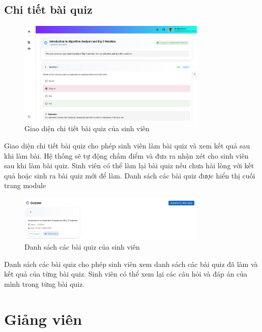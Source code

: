\subsection{Chi tiết bài quiz}
\begin{figure}[H]
    \centering
    \includegraphics[width=0.8\textwidth]{images/CapScreen_Student/Quiz.png}
    \caption{Giao diện chi tiết bài quiz của sinh viên}
    \label{fig:quiz_detail_page}
\end{figure}
Giao diện chi tiết bài quiz cho phép sinh viên làm bài quiz và xem kết quả sau khi làm bài. Hệ thống sẽ tự động chấm điểm và đưa ra nhận xét cho sinh viên sau khi làm bài quiz. Sinh viên có thể làm lại bài quiz nếu chưa hài lòng với kết quả hoặc sinh ra bài quiz mới để làm. Danh sách các bài quiz được hiển thị cuối trang module
\begin{figure}[H]
    \centering
    \includegraphics[width=0.8\textwidth]{images/CapScreen_Student/ViewQuiz.png}
    \caption{Danh sách các bài quiz của sinh viên}
    \label{fig:quiz_list_page}
\end{figure}
Danh sách các bài quiz cho phép sinh viên xem danh sách các bài quiz đã làm và kết quả của từng bài quiz. Sinh viên có thể xem lại các câu hỏi và đáp án của mình trong từng bài quiz.

\section{Giảng viên}
